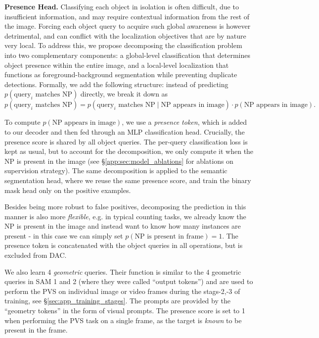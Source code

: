 \documentclass[]{fairmeta}
\newcommand{\pvstask}{PVS\xspace}
\renewcommand{\paragraph}[1]{%
	\noindent\textbf{#1.}\noindent\xspace%
}
\begin{document}
\paragraph{Presence Head} Classifying each object in isolation is often difficult, due to insufficient information, and may require contextual information from the rest of the image. Forcing each object query to acquire such global awareness is however detrimental, and can conflict with the localization objectives that are by nature very local.
To address this, we propose decomposing the classification problem into two complementary components: a global-level classification that determines object presence within the entire image, and a local-level localization that functions as foreground-background segmentation while preventing duplicate detections.
Formally, we add the following structure: instead of predicting $p(\text{query}_i\text{ matches NP})$ directly, we break it down as
$$
p(\text{query}_i \text{ matches NP}) =  
p(\text{query}_i \text{ matches NP}\mid \text{NP appears in image}) \cdot p(\text{NP appears in image}).$$


To compute $p(\text{NP appears in image})$, we use a \emph{presence token}, which is added to our decoder and then fed through an MLP classification head. Crucially, the presence score is shared by all object queries. The per-query classification loss is kept as usual, but to account for the decomposition, we only compute it when the NP is present in the image (see \S\ref{app:sec:model_ablations} for ablations on supervision strategy). The same decomposition is applied to the semantic segmentation head, where we reuse the same presence score, and train the binary mask head only on the positive examples.

Besides being more robust to false positives, decomposing the prediction in this manner is also more \textit{flexible}, e.g. in typical counting tasks, we already know the NP is present in the image and instead want to know how many instances are present - in this case we can simply set $p(\text{NP is present in frame})=1$.  The presence token is concatenated with the object queries in all operations, but is excluded from DAC. 

We also learn 4 \textit{geometric} queries. Their function is similar to the 4 geometric queries in SAM 1 and 2 (where they were called ``output tokens'') and are used to perform the \pvstask on individual image or video frames during the stags-2,-3 of training, see \S\ref{sec:app_training_stages}. The prompts are provided by the ``geometry tokens'' in the form of visual prompts. The presence score is set to 1 when performing the \pvstask task on a single frame, as the target is \textit{known} to be present in the frame.
\end{document}
